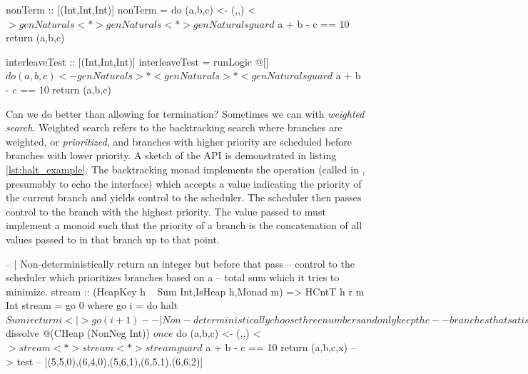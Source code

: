 \begin{code}
\begin{haskellcode}
nonTerm :: [(Int,Int,Int)]
nonTerm = do
  (a,b,c) <- (,,) <$> genNaturals <*> genNaturals <*> genNaturals
  guard $ a + b - c == 10
  return (a,b,c)
\end{haskellcode}
  \caption{\label{lst:list_logic_example}Using a simple list to drive
    non-determinism is implicitly equivalent to a DFS algorithm which
    in many useful cases does not terminate.}
\end{code}

\begin{code}
\begin{haskellcode}
interleaveTest :: [(Int,Int,Int)]
interleaveTest = runLogic @[] $ do
  (a,b,c) <- genNaturals >*< genNaturals >*< genNaturals
  guard $ a + b - c == 10
  return (a,b,c)
\end{haskellcode}
  \caption{\label{lst:interl_logic_example}Interleaving (in this
    example \hask{>*<}) is not \emph{actually} fair in the sense that
    it does not give all the processes}
\end{code}

Can we do better than allowing for termination? Sometimes we can with \emph{weighted
search}. Weighted search refers to the backtracking search where branches are
weighted, or \emph{prioritized}, and branches with higher
priority are scheduled before branches with lower priority. A sketch
of the API is demonstrated in listing \ref{lst:halt_example}. The
backtracking monad implements the  operation (called
 in \cite{kidneyAlgebrasWeightedSearch2021}, presumably to
echo the  interface) which accepts a value
indicating the priority of the current branch and yields control to
the scheduler. The scheduler then passes control to the branch with the highest
priority. The value passed to  must implement a
monoid such that the priority of a branch is the concatenation of all
values passed to  in that branch up to that point.

\begin{code}
\begin{haskellcode}
  -- | Non-deterministically return an integer but before that pass
  -- control to the scheduler which prioritizes branches based on a
  -- total sum which it tries to minimize.
  stream :: (HeapKey h ~ Sum Int,IsHeap h,Monad m) => HCntT h r m Int
  stream = go 0 where
    go i = do
      halt $ Sum i
      return i <|> go (i+1)

  -- | Non-deterministically choose three numbers and only keep the
  -- branches that satisfy a + b - c == 10. Avoid diverging by prefering
  -- branches for which the sum of the numbers is minimum.
  test2 :: IO [(Int,Int,Int)]
  test2 = takeListT 5 $ dissolve @(CHeap (NonNeg Int)) $ once $ do
    (a,b,c) <- (,,) <$> stream <*> stream <*> stream
    guard $ a + b - c == 10
    return (a,b,c,x)
  -- > test
  -- [(5,5,0),(6,4,0),(5,6,1),(6,5,1),(6,6,2)]
\end{haskellcode}
  \caption{\label{lst:halt_example}Prioritise branches that we want to
    be executed first.}
\end{code}


